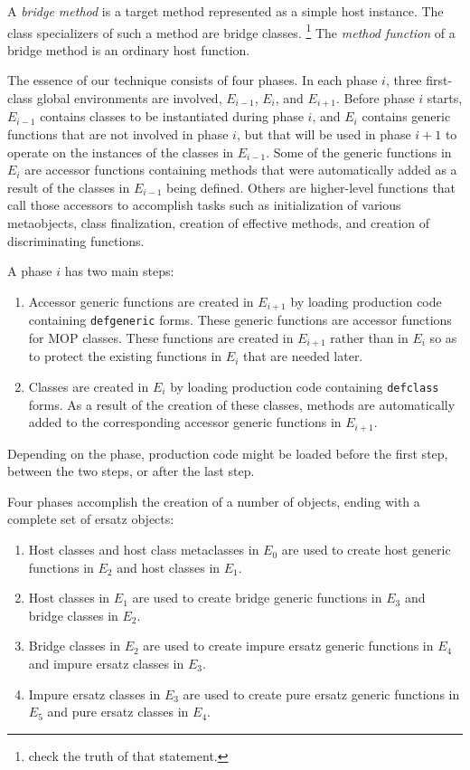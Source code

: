\begin{definition}
A \emph{bridge method} is a target method represented as a simple host
instance.  The class specializers of such a method are bridge classes.%
\footnote{check the truth of that statement.}
The \emph{method function} of a bridge method is an ordinary host
function.
\end{definition}

The essence of our technique consists of four phases.  In each phase
$i$, three first-class global environments are involved, $E_{i-1}$,
$E_{i}$, and $E_{i+1}$.  Before phase $i$ starts, $E_{i-1}$ contains
classes to be instantiated during phase $i$, and $E_i$ contains
generic functions that are not involved in phase $i$, but that will be
used in phase $i+1$ to operate on the instances of the classes in
$E_{i-1}$.  Some of the generic functions in $E_i$ are accessor
functions containing methods that were automatically added as a result
of the classes in $E_{i-1}$ being defined.  Others are higher-level
functions that call those accessors to accomplish tasks such as
initialization of various metaobjects, class finalization, creation of
effective methods, and creation of discriminating functions.

A phase $i$ has two main steps:

\begin{enumerate}
\item Accessor generic functions are created in $E_{i+1}$ by loading
  \sicl{} production code containing \texttt{defgeneric} forms.  These
  generic functions are accessor functions for MOP classes.  These
  functions are created in $E_{i+1}$ rather than in $E_i$ so as to
  protect the existing functions in $E_i$ that are needed later.
\item Classes are created in $E_i$ by loading \sicl{} production code
  containing \texttt{defclass} forms.  As a result of the creation of
  these classes, methods are automatically added to the corresponding
  accessor generic functions in $E_{i+1}$.
\end{enumerate}

Depending on the phase, \sicl{} production code might be loaded before
the first step, between the two steps, or after the last step.

Four phases accomplish the creation of a number of objects, ending
with a complete set of ersatz objects:

\begin{enumerate}
\item Host classes and host class metaclasses in $E_0$
  are used to create host generic functions in $E_2$ and host classes
  in $E_1$.
\item Host classes in $E_1$ are used to create bridge
  generic functions in $E_3$ and bridge classes in $E_2$.
\item Bridge classes in $E_2$ are used to create impure
  ersatz generic functions in $E_4$ and impure ersatz classes in
  $E_3$.
\item Impure ersatz classes in $E_3$ are used to create
  pure ersatz generic functions in $E_5$ and pure ersatz classes in
  $E_4$.
\end{enumerate}

